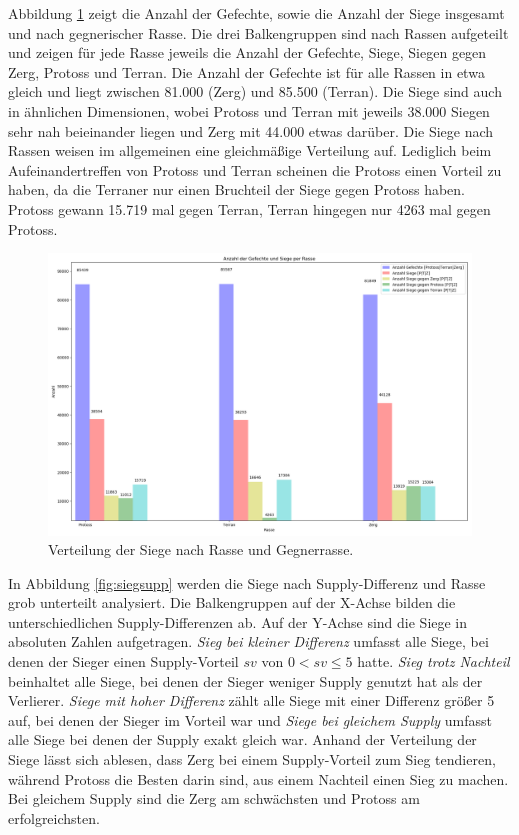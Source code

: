 Abbildung \ref{fig:siegvert} zeigt die Anzahl der Gefechte, sowie die Anzahl der Siege insgesamt und nach gegnerischer Rasse. Die drei Balkengruppen sind nach Rassen aufgeteilt und zeigen für jede Rasse jeweils die Anzahl der Gefechte, Siege, Siegen gegen Zerg, Protoss und Terran. Die Anzahl der Gefechte ist für alle Rassen in etwa gleich und liegt zwischen 81.000 (Zerg) und 85.500 (Terran). Die Siege sind auch in ähnlichen Dimensionen, wobei Protoss und Terran mit jeweils 38.000 Siegen sehr nah beieinander liegen und Zerg mit 44.000 etwas darüber. Die Siege nach Rassen weisen im allgemeinen eine gleichmäßige Verteilung auf. Lediglich beim Aufeinandertreffen von Protoss und Terran scheinen die Protoss einen Vorteil zu haben, da die Terraner nur einen Bruchteil der Siege gegen Protoss haben. Protoss gewann 15.719 mal gegen Terran, Terran hingegen nur 4263 mal gegen Protoss.

\begin{figure}[H]
\centering
\includegraphics[scale=0.4]{pictures/Graph_Matches_2}
\caption{Verteilung der Siege nach Rasse und Gegnerrasse.}
\label{fig:siegvert}
\end{figure}

In Abbildung \ref{fig:siegsupp} werden die Siege nach Supply-Differenz und Rasse grob unterteilt analysiert. Die Balkengruppen auf der X-Achse bilden die unterschiedlichen Supply-Differenzen ab. Auf der Y-Achse sind die Siege in absoluten  Zahlen aufgetragen. \textit{Sieg bei kleiner Differenz} umfasst alle Siege, bei denen der Sieger einen Supply-Vorteil $sv$ von $ 0 < sv \leq 5$ hatte. \textit{Sieg trotz Nachteil} beinhaltet alle Siege, bei denen der Sieger weniger Supply genutzt hat als der Verlierer. \textit{Siege mit hoher Differenz} zählt alle Siege mit einer Differenz größer 5 auf, bei denen der Sieger im Vorteil war und \textit{Siege bei gleichem Supply} umfasst alle Siege bei denen der Supply exakt gleich war. Anhand der Verteilung der Siege lässt sich ablesen, dass Zerg bei einem Supply-Vorteil zum Sieg tendieren, während Protoss die Besten darin sind, aus einem Nachteil einen Sieg zu machen. Bei gleichem Supply sind die Zerg am schwächsten und Protoss am erfolgreichsten. 


